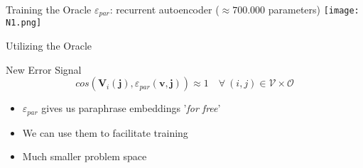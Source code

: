 \documentclass{beamer}
\begin{document}
\begin{frame}{Training the Oracle}
$\varepsilon_{par}$: \alert{recurrent autoencoder} ($\approx 700.000$ parameters)
\texttt{[image: N1.png]}
\end{frame}

\begin{frame}{Utilizing the Oracle}
\begin{block}{New Error Signal}
\[
cos(\pmb{V}_i(\pmb{j}), \varepsilon_{par}(\pmb{v},\pmb{j})) \approx 1
\quad \forall \ (i,j) \in \mathcal{V} \times \mathcal{O}
\]
\end{block}

\begin{itemize}
\item $\varepsilon_{par}$ gives us paraphrase embeddings '\textit{for free}'
\item We can use them to facilitate training
\item Much smaller problem space
\end{itemize}
\end{frame}
\end{document}
